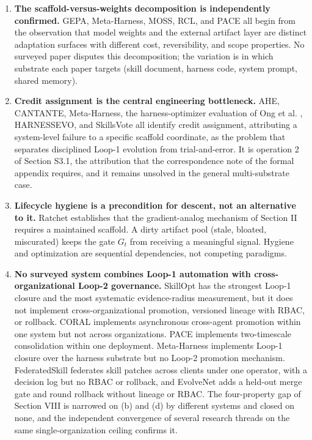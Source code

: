 \documentclass[
]{article}
\newcounter{none} %
\begin{document}
\begin{enumerate}
\def\labelenumi{\arabic{enumi}.}
\item
  \textbf{The scaffold-versus-weights decomposition is independently
  confirmed.} GEPA, Meta-Harness, MOSS, RCL, and PACE all begin from the
  observation that model weights and the external artifact layer are
  distinct adaptation surfaces with different cost, reversibility, and
  scope properties. No surveyed paper disputes this decomposition; the
  variation is in which substrate each paper targets (skill document,
  harness code, system prompt, shared memory).
\item
  \textbf{Credit assignment is the central engineering bottleneck.} AHE,
  CANTANTE, Meta-Harness, the harness-optimizer evaluation of Ong et al.
  \cite{ong2026harnesseval}, HARNESSEVO, and SkillsVote all identify
  credit assignment, attributing a system-level failure to a specific
  scaffold coordinate, as the problem that separates disciplined Loop-1
  evolution from trial-and-error. It is operation 2 of Section S3.1, the
  attribution that the correspondence note of the formal appendix
  requires, and it remains unsolved in the general multi-substrate case.
\item
  \textbf{Lifecycle hygiene is a precondition for descent, not an
  alternative to it.} Ratchet establishes that the gradient-analog
  mechanism of Section II requires a maintained scaffold. A dirty
  artifact pool (stale, bloated, miscurated) keeps the gate \(G_t\) from
  receiving a meaningful signal. Hygiene and optimization are sequential
  dependencies, not competing paradigms.
\item
  \textbf{No surveyed system combines Loop-1 automation with
  cross-organizational Loop-2 governance.} SkillOpt has the strongest
  Loop-1 closure and the most systematic evidence-radius measurement,
  but it does not implement cross-organizational promotion, versioned
  lineage with RBAC, or rollback. CORAL implements asynchronous
  cross-agent promotion within one system but not across organizations.
  PACE implements two-timescale consolidation within one deployment.
  Meta-Harness implements Loop-1 closure over the harness substrate but
  no Loop-2 promotion mechanism. FederatedSkill federates skill patches
  across clients under one operator, with a decision log but no RBAC or
  rollback, and EvolveNet adds a held-out merge gate and round rollback
  without lineage or RBAC. The four-property gap of Section VIII is
  narrowed on (b) and (d) by different systems and closed on none, and
  the independent convergence of several research threads on the same
  single-organization ceiling confirms it.
\end{enumerate}
\end{document}
